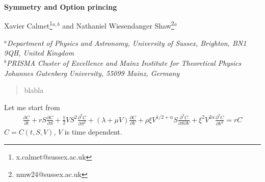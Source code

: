 \documentclass[english,12pt]{article}
\makeatletter
\def\@fmsl@sh#1#2#3{\m@th\ooalign{$\hfil#1\mkern#2/\hfil$\crcr$#1#3$}}
\makeatother
\begin{document}
\makeatletter
\def\fmslash{\@ifnextchar[{\fmsl@sh}{\fmsl@sh[0mu]}}
\def\fmsl@sh[#1]#2{%
  \mathchoice
    {\@fmsl@sh\displaystyle{#1}{#2}}%
    {\@fmsl@sh\textstyle{#1}{#2}}%
    {\@fmsl@sh\scriptstyle{#1}{#2}}%
    {\@fmsl@sh\scriptscriptstyle{#1}{#2}}}
\def\@fmsl@sh#1#2#3{\m@th\ooalign{$\hfil#1\mkern#2/\hfil$\crcr$#1#3$}}
\makeatother

\thispagestyle{empty}
\begin{titlepage}
\boldmath
\begin{center}
  \Large {\bf  Symmetry and Option princing}
    \end{center}
\unboldmath
\vspace{0.2cm}
\begin{center}
{  {\large Xavier Calmet}\footnote{x.calmet@sussex.ac.uk}$^{a,b}$ and {\large Nathaniel Wiesendanger Shaw}\footnote{nmw24@sussex.ac.uk}$^{a}$}
 \end{center}
\begin{center}
$^a${\sl Department of Physics and Astronomy, 
University of Sussex, Brighton, BN1 9QH, United Kingdom
}\\
$^b${\sl PRISMA Cluster of Excellence and Mainz Institute for Theoretical Physics Johannes Gutenberg University, 55099 Mainz, Germany }
\end{center}
\vspace{5cm}
\begin{abstract}
\noindent
blabla
\end{abstract}  
\end{titlepage}




\newpage

Let me start from
\begin{eqnarray}
\frac{\partial C}{\partial t}+ r S \frac{\partial C}{\partial S} + \frac{1}{2} V S^2 \frac{\partial^2 C}{\partial S^2} +(\lambda + \mu V) \frac{\partial C}{\partial V} +\rho \xi V^{1/2+\alpha} S \frac{\partial^2 C}{\partial S \partial V} +\xi^2 V^{2 \alpha}  \frac{\partial^2 C}{\partial V^2}= r C
\end{eqnarray}
$C=C(t,S,V)$, $V$ is time dependent.
 
\end{document}
